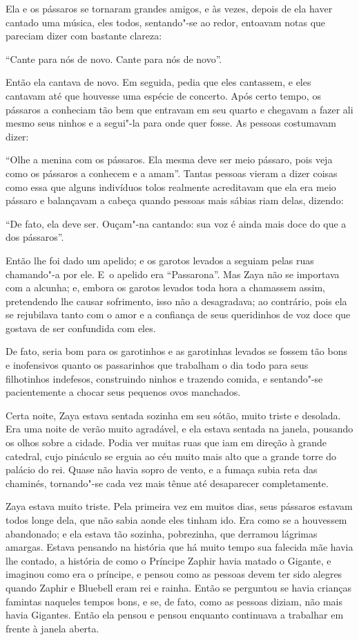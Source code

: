 Ela e os pássaros se tornaram grandes amigos, e às vezes, depois de ela
haver cantado uma música, eles todos, sentando"-se ao redor, entoavam
notas que pareciam dizer com bastante clareza:

``Cante para nós de novo. Cante para nós de novo''.

Então ela cantava de novo. Em seguida, pedia que eles cantassem, e eles
cantavam até que houvesse uma espécie de concerto. Após certo tempo, os
pássaros a conheciam tão bem que entravam em seu quarto e chegavam a
fazer ali mesmo seus ninhos e a segui"-la para onde quer fosse. As
pessoas costumavam dizer:

``Olhe a menina com os pássaros. Ela mesma deve ser meio pássaro, pois
veja como os pássaros a conhecem e a amam''. Tantas pessoas vieram a
dizer coisas como essa que alguns indivíduos tolos realmente acreditavam
que ela era meio pássaro e balançavam a cabeça quando pessoas mais
sábias riam delas, dizendo:

``De fato, ela deve ser. Ouçam"-na cantando: sua voz é ainda mais doce do
que a dos pássaros''.

Então lhe foi dado um apelido; e os garotos levados a seguiam pelas ruas
chamando"-a por ele. E~o apelido era ``Passarona''. Mas Zaya não se
importava com a alcunha; e, embora os garotos levados toda hora a
chamassem assim, pretendendo lhe causar sofrimento, isso não a
desagradava; ao contrário, pois ela se rejubilava tanto com o amor e a
confiança de seus queridinhos de voz doce que gostava de ser confundida
com eles.

De fato, seria bom para os garotinhos e as garotinhas levados se fossem
tão bons e inofensivos quanto os passarinhos que trabalham o dia todo
para seus filhotinhos indefesos, construindo ninhos e trazendo comida, e
sentando"-se pacientemente a chocar seus pequenos ovos manchados.

Certa noite, Zaya estava sentada sozinha em seu sótão, muito triste e
desolada. Era uma noite de verão muito agradável, e ela estava sentada
na janela, pousando os olhos sobre a cidade. Podia ver muitas ruas que
iam em direção à grande catedral, cujo pináculo se erguia ao céu muito
mais alto que a grande torre do palácio do rei. Quase não havia sopro de
vento, e a fumaça subia reta das chaminés, tornando"-se cada vez mais
tênue até desaparecer completamente.

Zaya estava muito triste. Pela primeira vez em muitos dias, seus
pássaros estavam todos longe dela, que não sabia aonde eles tinham ido.
Era como se a houvessem abandonado; e ela estava tão sozinha,
pobrezinha, que derramou lágrimas amargas. Estava pensando na história
que há muito tempo sua falecida mãe havia lhe contado, a história de
como o Príncipe Zaphir havia matado o Gigante, e imaginou como era o
príncipe, e pensou como as pessoas devem ter sido alegres quando Zaphir
e Bluebell eram rei e rainha. Então se perguntou se havia crianças
famintas naqueles tempos bons, e se, de fato, como as pessoas diziam,
não mais havia Gigantes. Então ela pensou e pensou enquanto continuava a
trabalhar em frente à janela aberta.

